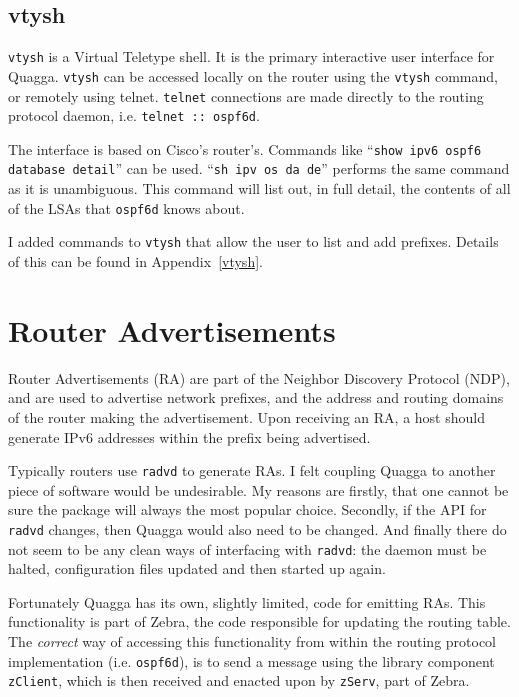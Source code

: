 \subsection{vtysh}
\texttt{vtysh}  is a
Virtual Teletype shell. It is the primary interactive user interface for
Quagga. \texttt{vtysh} can be accessed locally on the router using the
\texttt{vtysh} command, or remotely using telnet. \texttt{telnet} connections
are made directly to the routing protocol daemon, i.e. \texttt{telnet ::
ospf6d}.  

The interface is based on Cisco's router's. Commands like ``\texttt{show ipv6
ospf6 database detail}'' can be used. ``\texttt{sh ipv os da de}''  
performs the same command as it is unambiguous. This command will
list out, in full detail, the contents of all of the LSAs that \texttt{ospf6d}
knows about. 

I added commands to \texttt{vtysh} that allow the user to list and add
prefixes. Details of this can be found in Appendix~\ref{vtysh}. 

\section{Router Advertisements}
Router Advertisements (RA)  are part of
the Neighbor Discovery Protocol (NDP),  and are used to advertise network prefixes, and the address and
routing domains of the router making the advertisement. Upon receiving
an RA, a host should generate IPv6 addresses within the prefix being advertised. 

Typically routers use \texttt{radvd}  to generate RAs. I felt coupling Quagga to another
piece of software would be undesirable. My reasons are firstly, that one cannot
be sure the package will always the most popular choice. Secondly, if the
API for \texttt{radvd} changes, then Quagga would also need to be changed. And
finally there do not seem to be any clean ways of interfacing with
\texttt{radvd}: the daemon must be halted, configuration files updated and then
started up again.

Fortunately Quagga has its own, slightly limited, code for emitting RAs. This
functionality is part of Zebra, the code responsible for updating the routing
table. The \emph{correct} way of accessing this functionality from within the
routing protocol implementation (i.e. \texttt{ospf6d}), is to send a message
using the library component \texttt{zClient}, which is then received and
enacted upon by \texttt{zServ}, part of Zebra. 


